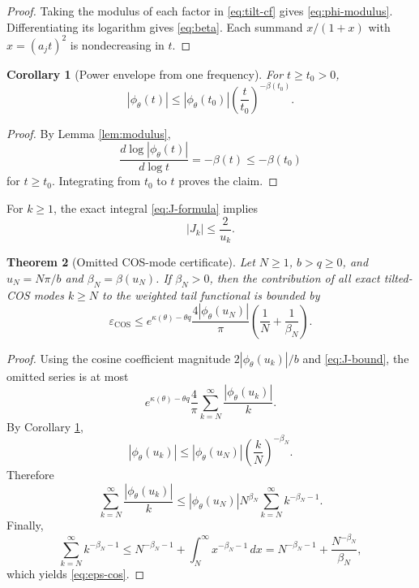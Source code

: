 \documentclass[11pt]{article}
\newtheorem{theorem}{Theorem}[section]
\newtheorem{corollary}[theorem]{Corollary}
\theoremstyle{definition}
\theoremstyle{remark}
\newcommand{\eps}{\varepsilon}
\begin{document}
\begin{proof}
Taking the modulus of each factor in \eqref{eq:tilt-cf} gives \eqref{eq:phi-modulus}. Differentiating its logarithm gives \eqref{eq:beta}. Each summand $x/(1+x)$ with $x=(a_jt)^2$ is nondecreasing in $t$.
\end{proof}

\begin{corollary}[Power envelope from one frequency]
\label{cor:power-envelope}
For $t\ge t_0>0$,
\begin{equation}
|\phi_{\theta}(t)|
\le
|\phi_{\theta}(t_0)|
\left(\frac{t}{t_0}\right)^{-\beta(t_0)}.
\label{eq:power-envelope}
\end{equation}
\end{corollary}

\begin{proof}
By Lemma \ref{lem:modulus},
\[
\frac{d\log|\phi_{\theta}(t)|}{d\log t}=-\beta(t)\le-\beta(t_0)
\]
for $t\ge t_0$. Integrating from $t_0$ to $t$ proves the claim.
\end{proof}

For $k\ge1$, the exact integral \eqref{eq:J-formula} implies
\begin{equation}
|J_k|
\le \frac{2}{u_k}.
\label{eq:J-bound}
\end{equation}

\begin{theorem}[Omitted COS-mode certificate]
\label{thm:cos-tail}
Let $N\ge1$, $b>q\ge0$, and $u_N=N\pi/b$ and $\beta_N=\beta(u_N)$. If $\beta_N>0$, then the contribution of all exact tilted-COS modes $k\ge N$ to the weighted tail functional is bounded by
\begin{equation}
\eps_{\mathrm{COS}}
\le
 e^{\kappa(\theta)-\theta q}
\frac{4|\phi_{\theta}(u_N)|}{\pi}
\left(\frac1N+\frac1{\beta_N}\right).
\label{eq:eps-cos}
\end{equation}
\end{theorem}

\begin{proof}
Using the cosine coefficient magnitude $2|\phi_{\theta}(u_k)|/b$ and \eqref{eq:J-bound}, the omitted series is at most
\[
e^{\kappa(\theta)-\theta q}
\frac{4}{\pi}
\sum_{k=N}^{\infty}\frac{|\phi_{\theta}(u_k)|}{k}.
\]
By Corollary \ref{cor:power-envelope},
\[
|\phi_{\theta}(u_k)|
\le
|\phi_{\theta}(u_N)|\left(\frac{k}{N}\right)^{-\beta_N}.
\]
Therefore
\[
\sum_{k=N}^{\infty}\frac{|\phi_{\theta}(u_k)|}{k}
\le
|\phi_{\theta}(u_N)|N^{\beta_N}
\sum_{k=N}^{\infty}k^{-\beta_N-1}.
\]
Finally,
\[
\sum_{k=N}^{\infty}k^{-\beta_N-1}
\le N^{-\beta_N-1}+\int_N^{\infty}x^{-\beta_N-1}\,dx
=N^{-\beta_N-1}+\frac{N^{-\beta_N}}{\beta_N},
\]
which yields \eqref{eq:eps-cos}.
\end{proof}
\end{document}
